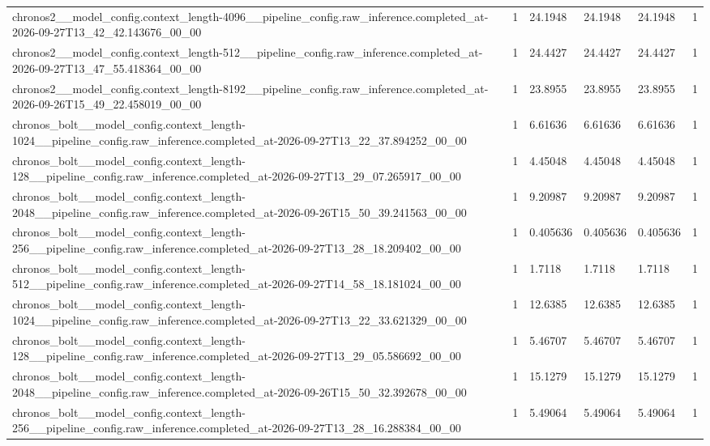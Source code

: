 \begin{tabular}{llllll}
chronos2\_\_model\_config.context\_length-4096\_\_pipeline\_config.raw\_inference.completed\_at-2026-09-27T13\_42\_42.143676\_00\_00 & 1 & 24.1948 & 24.1948 & 24.1948 & 1 \\
chronos2\_\_model\_config.context\_length-512\_\_pipeline\_config.raw\_inference.completed\_at-2026-09-27T13\_47\_55.418364\_00\_00 & 1 & 24.4427 & 24.4427 & 24.4427 & 1 \\
chronos2\_\_model\_config.context\_length-8192\_\_pipeline\_config.raw\_inference.completed\_at-2026-09-26T15\_49\_22.458019\_00\_00 & 1 & 23.8955 & 23.8955 & 23.8955 & 1 \\
chronos\_bolt\_\_model\_config.context\_length-1024\_\_pipeline\_config.raw\_inference.completed\_at-2026-09-27T13\_22\_37.894252\_00\_00 & 1 & 6.61636 & 6.61636 & 6.61636 & 1 \\
chronos\_bolt\_\_model\_config.context\_length-128\_\_pipeline\_config.raw\_inference.completed\_at-2026-09-27T13\_29\_07.265917\_00\_00 & 1 & 4.45048 & 4.45048 & 4.45048 & 1 \\
chronos\_bolt\_\_model\_config.context\_length-2048\_\_pipeline\_config.raw\_inference.completed\_at-2026-09-26T15\_50\_39.241563\_00\_00 & 1 & 9.20987 & 9.20987 & 9.20987 & 1 \\
chronos\_bolt\_\_model\_config.context\_length-256\_\_pipeline\_config.raw\_inference.completed\_at-2026-09-27T13\_28\_18.209402\_00\_00 & 1 & 0.405636 & 0.405636 & 0.405636 & 1 \\
chronos\_bolt\_\_model\_config.context\_length-512\_\_pipeline\_config.raw\_inference.completed\_at-2026-09-27T14\_58\_18.181024\_00\_00 & 1 & 1.7118 & 1.7118 & 1.7118 & 1 \\
chronos\_bolt\_\_model\_config.context\_length-1024\_\_pipeline\_config.raw\_inference.completed\_at-2026-09-27T13\_22\_33.621329\_00\_00 & 1 & 12.6385 & 12.6385 & 12.6385 & 1 \\
chronos\_bolt\_\_model\_config.context\_length-128\_\_pipeline\_config.raw\_inference.completed\_at-2026-09-27T13\_29\_05.586692\_00\_00 & 1 & 5.46707 & 5.46707 & 5.46707 & 1 \\
chronos\_bolt\_\_model\_config.context\_length-2048\_\_pipeline\_config.raw\_inference.completed\_at-2026-09-26T15\_50\_32.392678\_00\_00 & 1 & 15.1279 & 15.1279 & 15.1279 & 1 \\
chronos\_bolt\_\_model\_config.context\_length-256\_\_pipeline\_config.raw\_inference.completed\_at-2026-09-27T13\_28\_16.288384\_00\_00 & 1 & 5.49064 & 5.49064 & 5.49064 & 1 \\

\end{tabular}

